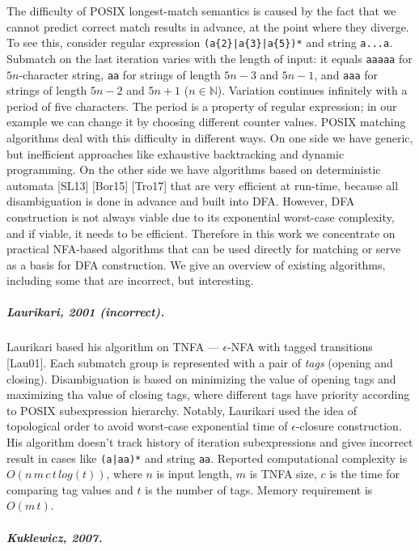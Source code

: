 \documentclass[AMA,STIX1COL]{WileyNJD-v2}
\newcommand{\YN}{\mathbb{N}}
\begin{document}
The difficulty of POSIX longest-match semantics is caused by the fact
that we cannot predict correct match results in advance, at the point where they diverge.
To see this, consider regular expression \texttt{(a\{2\}|a\{3\}|a\{5\})*} and string \texttt{a...a}.
Submatch on the last iteration varies with the length of input:
it equals \texttt{aaaaa} for $5n$-character string,
\texttt{aa} for strings of length $5n - 3$ and $5n - 1$,
and \texttt{aaa} for strings of length $5n - 2$ and $5n + 1$ ($n \in \YN$).
Variation continues infinitely with a period of five characters.
The period is a property of regular expression;
in our example we can change it by choosing different counter values.
POSIX matching algorithms deal with this difficulty in different ways.
On one side we have generic, but inefficient approaches like exhaustive backtracking and dynamic programming.
On the other side we have algorithms based on deterministic automata [SL13] [Bor15] [Tro17]
that are very efficient at run-time, because all disambiguation is done in advance and built into DFA.
However, DFA construction is not always viable due to its exponential worst-case complexity,
and if viable, it needs to be efficient.
Therefore in this work we concentrate on practical NFA-based algorithms
that can be used directly for matching or serve as a basis for DFA construction.
We give an overview of existing algorithms, including some that are incorrect, but interesting.

\subparagraph{Laurikari, 2001 (incorrect).}

Laurikari based his algorithm on TNFA ---
$\epsilon$-NFA with tagged transitions [Lau01].
Each submatch group is represented with a pair of \emph{tags} (opening and closing).
Disambiguation is based on minimizing the value of opening tags and maximizing tha value of closing tags, where
different tags have priority according to POSIX subexpression hierarchy.
Notably, Laurikari used the idea of topological order to avoid worst-case exponential time of $\epsilon$-closure construction.
His algorithm doesn't track history of iteration subexpressions and gives incorrect result in cases like \texttt{(a|aa)*} and string \texttt{aa}.
Reported computational complexity is $O(n \, m \, c \, t \, log(t))$, where
$n$ is input length,
$m$ is TNFA size,
$c$ is the time for comparing tag values
and $t$ is the number of tags.
Memory requirement is $O(m \, t)$.

\subparagraph{Kuklewicz, 2007.}
\end{document}
